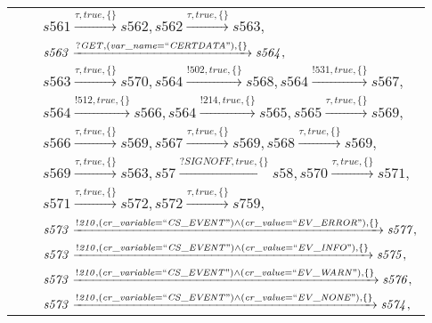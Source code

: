 \begin{tabular}{lcp{350px}}
\end{tabular}

\begin{tabular}{lcp{350px}}
& & $\mathit{s561}\xrightarrow{\mathit{\tau}, \mathit{true}, \{\}}\mathit{s562},\mathit{s562}\xrightarrow{\mathit{\tau}, \mathit{true}, \{\}}\mathit{s563},$ \\
& & $\mathit{s563}\xrightarrow{\mathit{?GET}, \mathit{(var\_name = ``CERTDATA")}, \{\}}\mathit{s564},$ \\
& & $\mathit{s563}\xrightarrow{\mathit{\tau}, \mathit{true}, \{\}}\mathit{s570},\mathit{s564}\xrightarrow{\mathit{!502}, \mathit{true}, \{\}}\mathit{s568},\mathit{s564}\xrightarrow{\mathit{!531}, \mathit{true}, \{\}}\mathit{s567},$ \\
& & $\mathit{s564}\xrightarrow{\mathit{!512}, \mathit{true}, \{\}}\mathit{s566},\mathit{s564}\xrightarrow{\mathit{!214}, \mathit{true}, \{\}}\mathit{s565},\mathit{s565}\xrightarrow{\mathit{\tau}, \mathit{true}, \{\}}\mathit{s569},$ \\
& & $\mathit{s566}\xrightarrow{\mathit{\tau}, \mathit{true}, \{\}}\mathit{s569},\mathit{s567}\xrightarrow{\mathit{\tau}, \mathit{true}, \{\}}\mathit{s569},\mathit{s568}\xrightarrow{\mathit{\tau}, \mathit{true}, \{\}}\mathit{s569},$ \\
& & $\mathit{s569}\xrightarrow{\mathit{\tau}, \mathit{true}, \{\}}\mathit{s563},\mathit{s57}\xrightarrow{\mathit{?SIGNOFF}, \mathit{true}, \{\}}\mathit{s58},\mathit{s570}\xrightarrow{\mathit{\tau}, \mathit{true}, \{\}}\mathit{s571},$ \\
& & $\mathit{s571}\xrightarrow{\mathit{\tau}, \mathit{true}, \{\}}\mathit{s572},\mathit{s572}\xrightarrow{\mathit{\tau}, \mathit{true}, \{\}}\mathit{s759},$ \\
& & $\mathit{s573}\xrightarrow{\mathit{!210}, \mathit{(cr\_variable = ``CS\_EVENT") \land (cr\_value = ``EV\_ERROR")}, \{\}}\mathit{s577},$ \\
& & $\mathit{s573}\xrightarrow{\mathit{!210}, \mathit{(cr\_variable = ``CS\_EVENT") \land (cr\_value = ``EV\_INFO")}, \{\}}\mathit{s575},$ \\
& & $\mathit{s573}\xrightarrow{\mathit{!210}, \mathit{(cr\_variable = ``CS\_EVENT") \land (cr\_value = ``EV\_WARN")}, \{\}}\mathit{s576},$ \\
& & $\mathit{s573}\xrightarrow{\mathit{!210}, \mathit{(cr\_variable = ``CS\_EVENT") \land (cr\_value = ``EV\_NONE")}, \{\}}\mathit{s574},$ \\

\end{tabular}
